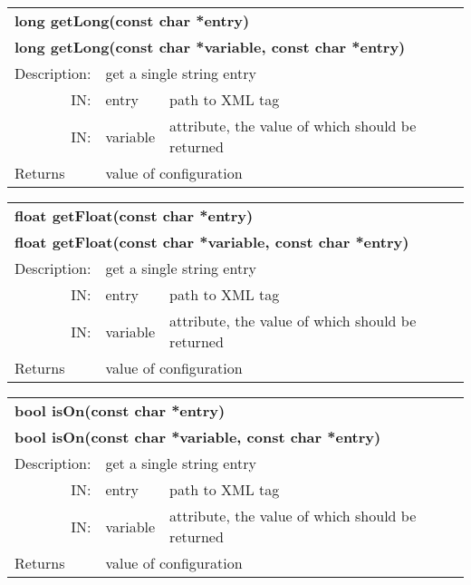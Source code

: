 \begin{longtable}{|p{4cm}|p{2.5cm}|p{7cm}|}
\hline
\multicolumn{3}{|p{13.5cm}|}{\bf long getLong(const char *entry)} \\
\multicolumn{3}{|p{13.5cm}|}{\bf long getLong(const char *variable, const char *entry)} \\
\hline
{Description:}   
              & \multicolumn{2}{|p{9.5cm}|}{get a single string entry} \\                     
\hline
\multicolumn{1}{|r|}{IN:} & {entry} 
                             & {path to XML tag }\\
\hline
\multicolumn{1}{|r|}{IN:} & {variable} 
                             & {attribute, the value of which should be returned}\\
\hline
{Returns}  
                        & \multicolumn{2}{|p{9.5cm}|}{value of configuration} \endhead
\hline
\end{longtable}



\begin{longtable}{|p{4cm}|p{2.5cm}|p{7cm}|}
\hline
\multicolumn{3}{|p{13.5cm}|}{\bf float getFloat(const char *entry)} \\
\multicolumn{3}{|p{13.5cm}|}{\bf float getFloat(const char *variable, const char *entry)} \\
\hline
{Description:}   
              & \multicolumn{2}{|p{9.5cm}|}{get a single string entry} \\                     
\hline
\multicolumn{1}{|r|}{IN:} & {entry} 
                             & {path to XML tag }\\
\hline
\multicolumn{1}{|r|}{IN:} & {variable} 
                             & {attribute, the value of which should be returned}\\
\hline
{Returns}  
                        & \multicolumn{2}{|p{9.5cm}|}{value of configuration} \endhead
\hline
\end{longtable}



\begin{longtable}{|p{4cm}|p{2.5cm}|p{7cm}|}
\hline
\multicolumn{3}{|p{13.5cm}|}{\bf bool isOn(const char *entry)} \\
\multicolumn{3}{|p{13.5cm}|}{\bf bool isOn(const char *variable, const char *entry)} \\
\hline
{Description:}   
              & \multicolumn{2}{|p{9.5cm}|}{get a single string entry} \\                     
\hline
\multicolumn{1}{|r|}{IN:} & {entry} 
                             & {path to XML tag }\\
\hline
\multicolumn{1}{|r|}{IN:} & {variable} 
                             & {attribute, the value of which should be returned}\\
\hline
{Returns}  
                        & \multicolumn{2}{|p{9.5cm}|}{value of configuration} \endhead
\hline
\end{longtable}



